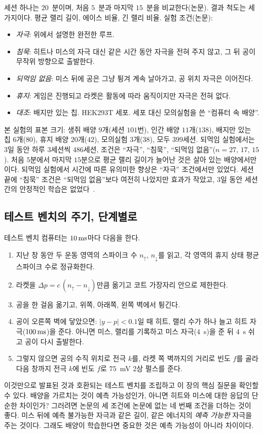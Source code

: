 세션 하나는 $20$~분이며, 처음 $5$~분과 마지막 $15$~분을 비교한다(논문). 결과 척도는 세 가지이다. 평균 랠리 길이, 에이스 비율, 긴 랠리 비율. 실험 조건(논문):
\begin{itemize}
\item \emph{자극}: 위에서 설명한 완전한 루프.
\item \emph{침묵}: 히트나 미스의 자극 대신 같은 시간 동안 자극을 전혀 주지 않고, 그 뒤 공이 무작위 방향으로 출발한다.
\item \emph{되먹임 없음}: 미스 뒤에 공은 그냥 튕겨 계속 날아가고, 공 위치 자극은 이어진다.
\item \emph{휴지}: 게임은 진행되고 라켓은 활동에 따라 움직이지만 자극은 전혀 없다.
\item \emph{대조}: 배지만 있는 칩. HEK293T 세포. 세포 대신 모의실험을 쓴 “컴퓨터 속 배양”.
\end{itemize}
본 실험의 표본 크기: 생쥐 배양 $9$개(세션 $101$번), 인간 배양 $11$개($138$), 배지만 있는 칩 $6$개($80$), 휴지 배양 $20$개($42$), 모의실험 $3$개($38$), 모두 $399$세션. 되먹임 실험에서는 $3$일 동안 하루 $3$세션씩 $486$세션, 조건은 “자극”, “침묵”, “되먹임 없음”($n=27$, $17$, $15$). 처음 $5$분에서 마지막 $15$분으로 평균 랠리 길이가 늘어난 것은 살아 있는 배양에서만이다. 되먹임 실험에서 시간에 따른 유의미한 향상은 “자극” 조건에서만 있었다. 세션 끝에 “침묵” 조건은 “되먹임 없음”보다 여전히 나았지만 효과가 작았고, 3일 동안 세션 간의 안정적인 학습은 없었다~\cite{Kagan2022}.

\subsection*{테스트 벤치의 주기, 단계별로}

테스트 벤치 컴퓨터는 $10\,\text{ms}$마다 다음을 한다.
\begin{enumerate}
\item 지난 창 동안 두 운동 영역의 스파이크 수 $n_\uparrow$, $n_\downarrow$를 읽고, 각 영역의 휴지 상태 평균 스파이크 수로 정규화한다.
\item 라켓을 $\Delta p=c\,(n_\uparrow-n_\downarrow)$만큼 옮기고 코트 가장자리 안으로 제한한다.
\item 공을 한 걸음 옮기고, 위쪽, 아래쪽, 왼쪽 벽에서 튕긴다.
\item 공이 오른쪽 벽에 닿았으면: $|y-p|<0.1$일 때 히트, 랠리 수가 하나 늘고 히트 자극($100\,\text{ms}$)을 준다. 아니면 미스, 랠리를 기록하고 미스 자극($4$~s)을 준 뒤 $4$~s 쉬고 공이 다시 출발한다.
\item 그렇지 않으면 공의 수직 위치로 전극 $k$를, 라켓 쪽 벽까지의 거리로 빈도 $f$를 골라 다음 창까지 전극 $k$에 빈도 $f$로 $75$~mV 2상 펄스를 준다.
\end{enumerate}
이것만으로 발표된 것과 호환되는 테스트 벤치를 조립하고 이 장의 핵심 질문을 확인할 수 있다. 배양을 가르치는 것이 예측 가능성인가, 아니면 히트와 미스에 대한 응답의 단순한 차이인가? 그러려면 논문의 세 조건에 논문에 없는 네 번째 조건을 더하는 것이 좋다. 미스 뒤에 예측 불가능한 자극과 같은 길이, 같은 에너지의 \emph{예측 가능한} 자극을 주는 것이다. 그래도 배양이 학습한다면 중요한 것은 예측 가능성이 아니라 차이이다.
